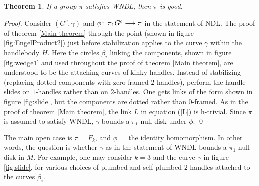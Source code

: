 \documentclass[12pt]{amsart}
\theoremstyle{definition}
\theoremstyle{remark}
\numberwithin{equation}{section}
\theoremstyle{plain}
\newtheorem{thm}{Theorem}
\theoremstyle{definition}
\newcommand{\co}{\colon\thinspace}
\numberwithin{figure}{section}
\begin{document}
\begin{thm} \label{pi1null thm} \sl 
If a group ${\pi}$ satisfies WNDL, then ${\pi}$ is good.
\end{thm}

{\em Proof.} Consider $(G^c, {\gamma})$ and ${\phi}\co {\pi}_1 G^c\longrightarrow {\pi}$ in the statement of NDL.
The proof of theorem \ref{Main theorem} through the point (shown in figure \ref{fig:EngelProduct2}) just before stabilization applies to the curve ${\gamma}$ within the handlebody $H$. Here the circles ${\beta}_i$ linking the components, shown in figure \ref{fig:wedge1} and used throughout the proof of theorem \ref{Main theorem}, are understood to be the attaching curves of kinky handles. Instead of stabilizing (replacing dotted components with zero-framed $2$-handles), perform the handle slides on $1$-handles rather than on $2$-handles. One gets links of the form  shown in figure \ref{fig:slide}, but the components are dotted rather than $0$-framed. As in the proof of theorem \ref{Main theorem}, the link $L$ in equation (\ref{L}) is h-trivial. Since ${\pi}$ is assumed to satisfy WNDL, ${\gamma}$ bounds a ${\pi}_1$-null disk under $\phi$.
\qed

The main open case is 
${\pi}=F_k$, and ${\phi}=$ the identity homomorphism. In other words, the question is whether ${\gamma}$ as in the statement of WNDL bounds a ${\pi}_1$-null disk in $M$. For example, one may consider $k=3$ and the curve $\gamma$ in figure \ref{fig:slide}, for various choices of plumbed and self-plumbed $2$-handles attached to the curves ${\beta}_i$. 
\end{document}
